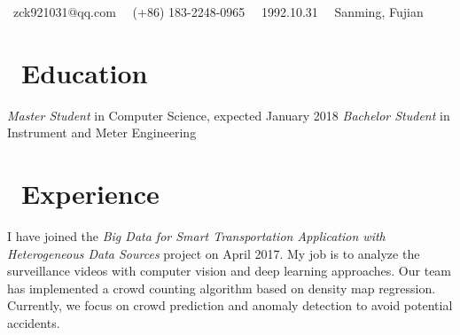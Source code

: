 \documentclass{resume}
\begin{document}
\centerline{\sffamily\large{\faEnvelope\ {zck921031@qq.com} \textperiodcentered\ \faPhone\ {(+86) 183-2248-0965} \textperiodcentered\ \faBirthdayCake\ {1992.10.31} \textperiodcentered\ \faHome\ {Sanming, Fujian}} }
\section{\faGraduationCap\  Education}
\textit{Master Student} in Computer Science, expected January 2018
\textit{Bachelor Student} in Instrument and Meter Engineering
\section{\faUsers\ Experience}
I have joined the \textsl{Big Data for Smart Transportation Application with Heterogeneous Data Sources} project on April 2017.
My job is to analyze the surveillance videos with computer vision and deep learning approaches.
Our team has implemented a crowd counting algorithm based on density map regression.
Currently, we focus on crowd prediction and anomaly detection to avoid potential accidents.
\end{document}
